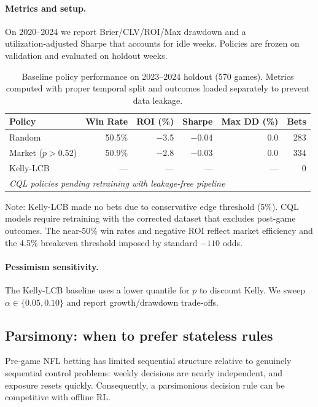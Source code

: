 \paragraph{Metrics and setup.} On 2020--2024 we report Brier/CLV/ROI/Max drawdown and a utilization‑adjusted Sharpe that accounts for idle weeks. Policies are frozen on validation and evaluated on holdout weeks.

\begin{table}[t]
  \centering
  \small
  \caption[RL vs stateless baseline]{Baseline policy performance on 2023--2024 holdout (570 games). Metrics computed with proper temporal split and outcomes loaded separately to prevent data leakage.}
  \label{tab:rl-vs-baseline}
  \begin{threeparttable}
  \begin{tabular}{lrrrrr}
    \toprule
    Policy & Win Rate & ROI (\%) & Sharpe & Max DD (\%) & Bets \\
    \midrule
    Random & 50.5\% & $-$3.5 & $-$0.04 & 0.0 & 283 \\
    Market ($p > 0.52$) & 50.9\% & $-$2.8 & $-$0.03 & 0.0 & 334 \\
    Kelly-LCB & --- & --- & --- & --- & 0 \\
    \midrule
    \multicolumn{6}{l}{\textit{CQL policies pending retraining with leakage-free pipeline}} \\
    \bottomrule
  \end{tabular}
  \begin{tablenotes}
    \small
    \item Note: Kelly-LCB made no bets due to conservative edge threshold (5\%). CQL models require retraining with the corrected dataset that excludes post-game outcomes. The near-50\% win rates and negative ROI reflect market efficiency and the 4.5\% breakeven threshold imposed by standard $-110$ odds.
  \end{tablenotes}
  \end{threeparttable}
\end{table}

\paragraph{Pessimism sensitivity.} The Kelly-LCB baseline uses a lower quantile for $p$ to discount Kelly. We sweep $\alpha\in\{0.05,0.10\}$ and report growth/drawdown trade‑offs.

\subsection{Parsimony: when to prefer stateless rules}\label{sec:parsimonious-choice}
Pre‑game NFL betting has limited sequential structure relative to genuinely sequential control problems: weekly decisions are nearly independent, and exposure resets quickly. Consequently, a parsimonious decision rule can be competitive with offline RL.

